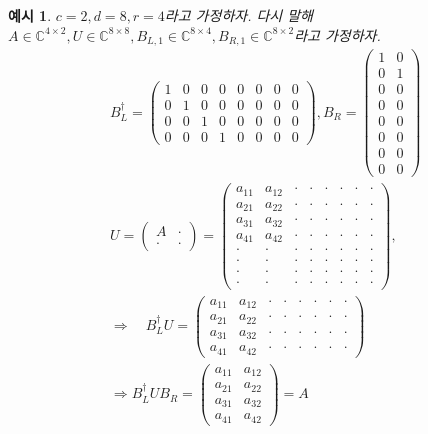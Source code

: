 \documentclass[hidelinks,article,a4paper,chapter,twocolumn]{oblivoir}
\newtheorem{exem}{예시}[chapter]
\let\oldbibliography
\renewcommand{}[1]{{%
\let\chapter\section
\oldbibliography{#1}}}
\begin{document}
\begin{exem}
$c=2,d=8,r=4$라고 가정하자. 다시 말해 $A\in\mathbb{C}^{4\times2},
U\in\mathbb{C}^{8\times 8}, B_{L,1}\in\mathbb{C}^{8\times 4}, 
B_{R,1}\in\mathbb{C}^{8\times 2}$라고 가정하자.
\begingroup
\setlength\arraycolsep{-0.1pt}
\begin{align*}
  &B^{\dagger}_{L} =
    \begin{pmatrix}
      1&0&0&0&0&0&0&0\\0&1&0&0&0&0&0&0\\0&0&1&0&0&0&0&0\\0&0&0&1&0&0&0&0
  \end{pmatrix},
  B_{R} =  \begin{pmatrix}
    1&0\\0&1\\0&0\\0&0\\0&0\\0&0\\0&0\\0&0
  \end{pmatrix}\\
  &U = \begin{pmatrix}A&\cdot\\\cdot&\cdot\end{pmatrix} =
  \begin{pmatrix}
    a_{11}&a_{12}&\cdot&\cdot&\cdot&\cdot&\cdot&\cdot\\
    a_{21}&a_{22}&\cdot&\cdot&\cdot&\cdot&\cdot&\cdot\\
    a_{31}&a_{32}&\cdot&\cdot&\cdot&\cdot&\cdot&\cdot\\
    a_{41}&a_{42}&\cdot&\cdot&\cdot&\cdot&\cdot&\cdot\\
    \cdot&\cdot&\cdot&\cdot&\cdot&\cdot&\cdot&\cdot\\
    \cdot&\cdot&\cdot&\cdot&\cdot&\cdot&\cdot&\cdot\\
    \cdot&\cdot&\cdot&\cdot&\cdot&\cdot&\cdot&\cdot\\
    \cdot&\cdot&\cdot&\cdot&\cdot&\cdot&\cdot&\cdot
  \end{pmatrix},\\
  &\Rightarrow\quad B_{L}^{\dagger}U = 
  \begin{pmatrix}
    a_{11}&a_{12}&\cdot&\cdot&\cdot&\cdot&\cdot&\cdot\\
    a_{21}&a_{22}&\cdot&\cdot&\cdot&\cdot&\cdot&\cdot\\
    a_{31}&a_{32}&\cdot&\cdot&\cdot&\cdot&\cdot&\cdot\\
    a_{41}&a_{42}&\cdot&\cdot&\cdot&\cdot&\cdot&\cdot
  \end{pmatrix}\\&\Rightarrow
  B_{L}^{\dagger}UB_{R} =
  \begin{pmatrix}
    a_{11}&a_{12}\\a_{21}&a_{22}\\a_{31}&a_{32}\\a_{41}&a_{42}
  \end{pmatrix}
= A
\end{align*}
\endgroup
\end{exem}


\end{document}
